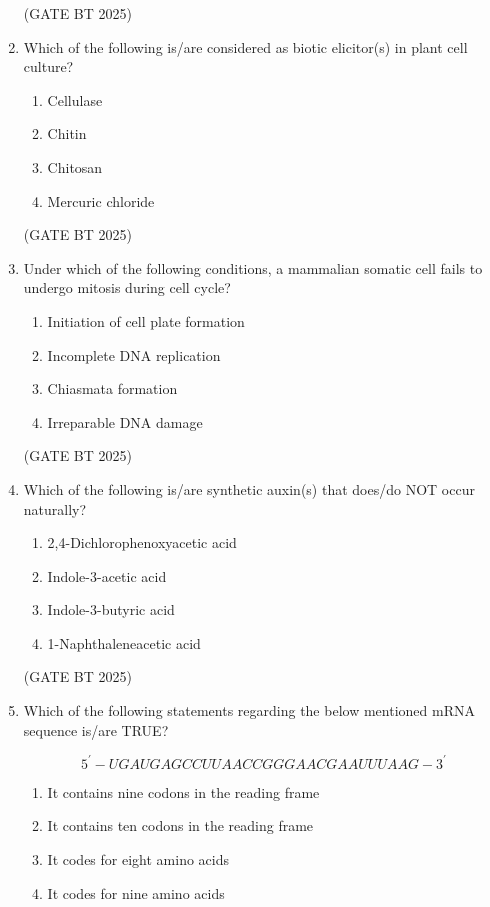 \documentclass[journal,12pt,onecolumn]{IEEEtran}
\theoremstyle{remark}
\begin{document}
\begin{enumerate}
\hfill (GATE BT 2025)

\item Which of the following is/are considered as biotic elicitor(s) in plant cell culture?

\begin{enumerate}
\item Cellulase 
\item Chitin 
\item Chitosan 
\item Mercuric chloride
\end{enumerate}

\hfill (GATE BT 2025)

\item Under which of the following conditions, a mammalian somatic cell fails to undergo mitosis during cell cycle?

\begin{enumerate}
\item Initiation of cell plate formation 
\item Incomplete DNA replication 
\item Chiasmata formation 
\item Irreparable DNA damage
\end{enumerate}

\hfill (GATE BT 2025)

\item Which of the following is/are synthetic auxin(s) that does/do NOT occur naturally?

\begin{enumerate}
\item 2,4-Dichlorophenoxyacetic acid 
\item Indole-3-acetic acid 
\item Indole-3-butyric acid 
\item 1-Naphthaleneacetic acid
\end{enumerate}

\hfill (GATE BT 2025)

\item Which of the following statements regarding the below mentioned mRNA sequence is/are TRUE? 

\[
5^\prime-UGAUGAGCCUUAACCGGGAACGAAUUUAAG-3^\prime
\]

\begin{enumerate}
\item It contains nine codons in the reading frame \hfill
\item It contains ten codons in the reading frame \hfill
\item It codes for eight amino acids \hfill
\item It codes for nine amino acids
\end{enumerate}


\end{enumerate}
\end{document}
